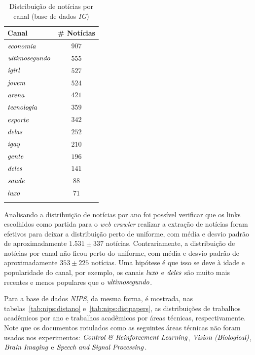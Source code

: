 \documentclass[
    12pt,                %
    oneside,            %
    a4paper,            %
    english,            %
    brazil                %
    ]{abntex2ppgsi}
\begin{document}
\begin{table}[h]
\centering
\caption{Distribuição de notícias por canal (base de dados \textit{IG})}
    \begin{tabular}{lc}
        \hline
        \textbf{Canal} & \# \textbf{Notícias} \\
        \hline
        $\text{\textit{economia}}$      & $907$ \\
        $\text{\textit{ultimosegundo}}$ & $555$ \\
        $\text{\textit{igirl}}$         & $527$ \\
        $\text{\textit{jovem}}$         & $524$ \\
        $\text{\textit{arena}}$         & $421$ \\
        $\text{\textit{tecnologia}}$    & $359$ \\
        $\text{\textit{esporte}}$       & $342$ \\
        $\text{\textit{delas}}$         & $252$ \\
        $\text{\textit{igay}}$          & $210$ \\
        $\text{\textit{gente}}$         & $196$ \\
        $\text{\textit{deles}}$         & $141$ \\
        $\text{\textit{saude}}$         & $88$  \\
        $\text{\textit{luxo}}$          & $71$  \\
        \hline
        & \\
    \end{tabular}
    \label{tab:ig:distcanal}
\end{table}

Analisando a distribuição de notícias por ano foi possível verificar que os links escolhidos como partida para o \textit{web crawler} realizar a extração de notícias foram efetivos para deixar a distribuição perto de uniforme, com média e desvio padrão de aproximadamente $1.531 \pm 337$ notícias.
Contrariamente, a distribuição de notícias por canal não ficou perto do uniforme, com média e desvio padrão de aproximadamente $353 \pm 225$ notícias.
Uma hipótese é que isso se deve à idade e popularidade do canal, por exemplo, os canais $\text{\textit{luxo}}$ e $\text{\textit{deles}}$ são muito mais recentes e menos populares que o $\text{\textit{ultimosegundo}}$.

Para a base de dados \textit{NIPS}, da mesma forma, é mostrada, nas tabelas~\ref{tab:nips:distano} e~\ref{tab:nips:distpapers}, as distribuições de trabalhos acadêmicos por ano e trabalhos acadêmicos por áreas técnicas, respectivamente.
Note que os documentos rotulados como as seguintes áreas técnicas não foram usados nos experimentos: $\text{\textit{Control \& Reinforcement Learning}}$, $\text{\textit{Vision (Biological)}}$, $\text{\textit{Brain Imaging}}$ e $\text{\textit{Speech and Signal Processing}}$.
\end{document}
